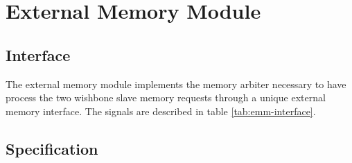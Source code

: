 \section{External Memory Module}

  \subsection{Interface}

    \begin{content}
        The external memory module implements the memory arbiter necessary to have process the two wishbone slave memory requests through a unique external memory interface. The signals are described in table \ref{tab:emm-interface}. 
      \end{content}

    

  \subsection{Specification}


\newpage
